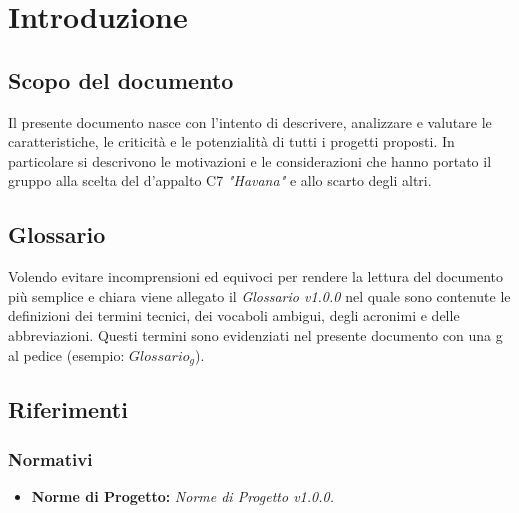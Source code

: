 \section{Introduzione}
	\subsection{Scopo del documento}
	Il presente documento nasce con l'intento di descrivere, analizzare e valutare le caratteristiche, le criticità e le potenzialità di tutti i progetti proposti. In particolare si descrivono le motivazioni e le considerazioni che hanno portato il gruppo alla scelta del  d'appalto C7 \emph{"Havana"} e allo scarto degli altri.
	\subsection{Glossario}
	Volendo evitare incomprensioni  ed equivoci per rendere la lettura del documento più semplice e chiara viene allegato il \emph{Glossario v1.0.0} nel quale sono contenute le definizioni dei termini tecnici, dei vocaboli ambigui, degli acronimi e delle abbreviazioni. Questi termini sono evidenziati nel presente documento con una g al pedice (esempio: $Glossario_{g}$).  
	\subsection{Riferimenti}
		\subsubsection{Normativi}
		\begin{itemize}
			\item \textbf{Norme di Progetto:} \emph{Norme di Progetto v1.0.0.}
		\end{itemize}
		
